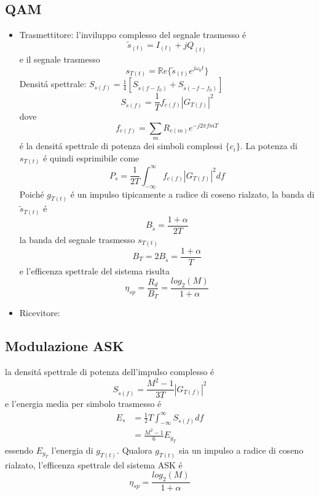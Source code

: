     \subsection{QAM}
        \begin{itemize}
            \item {Trasmettitore:
                l'inviluppo complesso del segnale trasmesso é 
                \[
                    \tilde{s}_{(t)} = I_{(t)} +j Q_{(t)}      
                \]
                e il segnale trasmesso
                \[
                    s_{T(t)} = \mathbb{R}e\{\tilde{s}_{(t)}e^{j\omega_0t}\}
                \]
                Densitá spettrale: $S_{s(f)} = \frac{1}{4}\left[S_{\tilde{s}{(f-f_0)}}+ S_{\tilde{s}{(-f-f_0)}}\right]$
                \[
                    S_{\tilde{s}{(f)}} = \frac{1}{T} f_{c(f)}\left|G_{T(f)}\right|^2    
                \]
                dove 
                \[
                    f_{c(f)} = \sum_{m}R_{c(m)}e^{-j2\pi fmT}
                \]
                é la densitá spettrale di potenza dei simboli complessi $\{c_i\}$. La potenza di $s_{T(t)}$ é quindi esprimibile come
                \[
                    P_s=\frac{1}{2T} \int_{-\infty}^{\infty} f_{c(f)} \left|G_{T(f)}\right|^2 df
                \]
                Poiché $g_{T(t)}$ é un impulso tipicamente a radice di coseno rialzato, la banda di $\tilde{s}_{T(t)}$ é 
                \[
                    B_{\tilde{s}}=\frac{1+\alpha}{2T}    
                \]
                la banda del segnale trasmesso $s_{T(t)}$ 
                \[
                    B_{T}=2B_{\tilde{s}} =\frac{1+\alpha}{T}
                \]
                e l'efficenza spettrale del sistema risulta 
                \[
                    \eta_{sp} = \frac{R_d}{B_T} = \frac{log_2(M)}{1+\alpha} 
                \]
            }
            \item {Ricevitore:

            }
        \end{itemize}
            
    \subsection{Modulazione ASK}
        la densitá spettrale di potenza dell'impulso complesso é 
        \[
            S_{\tilde{s}(f)} = \frac{M^2-1}{3T}\left|G_{T(f)}\right|^2
        \]
        e l'energia media per simbolo trasmesso é 
        \begin{align}
            E_s &= \frac{1}{2}T\int_{-\infty}^{\infty}S_{\tilde{s}(f)}df\nonumber \\
                &= \frac{M^2-1}{6}E_{g_T}\nonumber
        \end{align}
        essendo $E_{g_T}$ l'energia di $g_{T(t)}$. Qualora $g_{T(t)}$ sia un impulso a radice di coseno rialzato, l'efficenza spettrale
        del sistema ASK é 
        \[
            \eta_{sp} = \frac{log_2(M)}{1+\alpha}    
        \]
